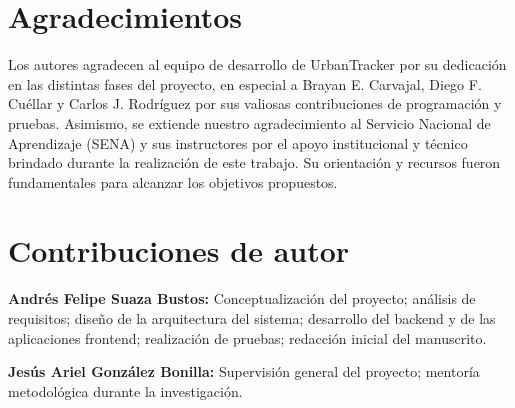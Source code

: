 \appendix
\section{Agradecimientos}
Los autores agradecen al equipo de desarrollo de UrbanTracker por su dedicación en las distintas fases del proyecto, en especial a Brayan E. Carvajal, Diego F. Cuéllar y Carlos J. Rodríguez por sus valiosas contribuciones de programación y pruebas. Asimismo, se extiende nuestro agradecimiento al Servicio Nacional de Aprendizaje (SENA) y sus instructores por el apoyo institucional y técnico brindado durante la realización de este trabajo. Su orientación y recursos fueron fundamentales para alcanzar los objetivos propuestos.

\section{Contribuciones de autor}
\textbf{Andrés Felipe Suaza Bustos:} Conceptualización del proyecto; análisis de requisitos; diseño de la arquitectura del sistema; desarrollo del backend y de las aplicaciones frontend; realización de pruebas; redacción inicial del manuscrito.

\textbf{Jesús Ariel González Bonilla:} Supervisión general del proyecto; mentoría metodológica durante la investigación.
